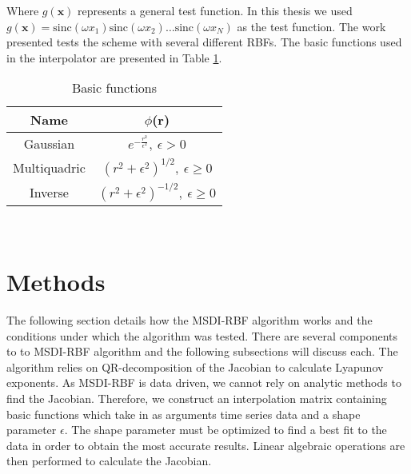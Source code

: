                   Where $g(\mathbf{x})$ represents a general test function. In this thesis we used $g(\mathbf{x})=\text{sinc}(\omega x_1)\text{sinc}(\omega x_2)\ldots\text{sinc}(\omega x_N)$ as the test function.
                    The work presented tests the scheme with several different RBFs. The basic functions used in the interpolator are presented
                  in Table \ref{table:2}.
                  \begin{table}
                          \centering
                          \begin{tabular}[h]{||c c||}
                              \hline
                              Name & $\phi$(r) \\ [0.5ex]
                              \hline
                              Gaussian & $e^{-\frac{r^2}{\epsilon^2}}, \ \epsilon>0$ \\
                              \hline
                              Multiquadric & $(r^2 + \epsilon^2)^{1/2}, \ \epsilon\geq 0$ \\
                              \hline
                              Inverse & $(r^2 + \epsilon^2)^{-1/2}, \ \epsilon\geq 0$ \\ [1ex]
                              \hline
                          \end{tabular}\\
                          \caption{Basic functions}\label{table:2}
                      \end{table}
\chapter{Methods}
\label{chap:methods}

        The following section details how the MSDI-RBF algorithm works and the conditions under which the algorithm was
        tested.
        There are several components to to MSDI-RBF algorithm and the following subsections will discuss each.
        The algorithm relies on QR-decomposition of the Jacobian to calculate Lyapunov exponents. As MSDI-RBF is
        data driven, we cannot rely on analytic methods to find the Jacobian. Therefore, we construct an interpolation
        matrix containing basic functions which take in as arguments time series data and a shape parameter $\epsilon$.
        The shape parameter must be optimized to find a best fit to the data in order to obtain the most accurate results.
        Linear algebraic operations are then performed to calculate the Jacobian.\\

